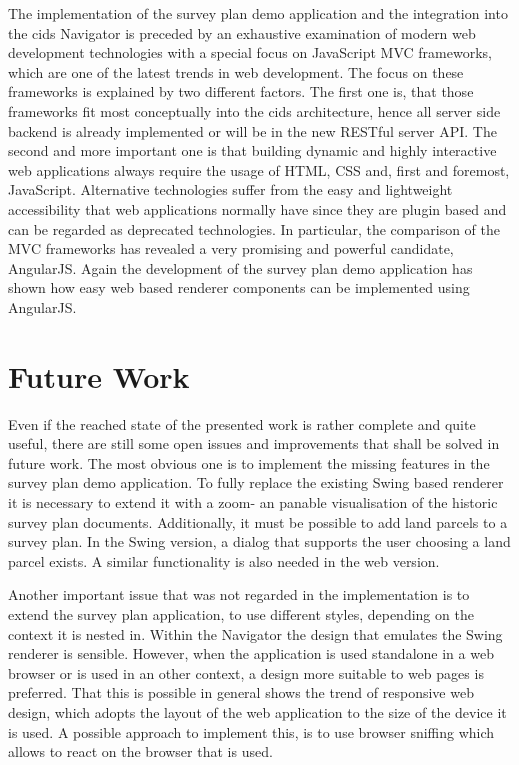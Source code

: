 The implementation of the survey plan demo application and the integration into the cids Navigator is preceded by an exhaustive examination of modern web development technologies with a special focus on JavaScript MVC frameworks, which are one of the latest trends in web development. 
The focus on these frameworks is explained by two different factors. 
The first one is, that those frameworks fit most conceptually into the cids architecture, hence all server side backend is already implemented or will be in the new RESTful server API. 
The second and more important one is that building dynamic and highly interactive web applications always require the usage of HTML, CSS and, first and foremost, JavaScript. 
Alternative technologies suffer from the easy and lightweight accessibility that web applications normally have since they are plugin based and can be regarded as deprecated technologies. 
In particular, the comparison of the MVC frameworks has revealed a very promising and powerful candidate, AngularJS. 
Again the development of the survey plan demo application has shown how easy web based renderer components can be implemented using AngularJS.  

\newpage

\section{Future Work}

Even if the reached state of the presented work is rather complete and quite useful, there are still some open issues and improvements that shall be solved in future work. 
The most obvious one is to implement the missing features in the survey plan demo application. 
To fully replace the existing Swing based renderer it is necessary to extend it with a zoom- an panable visualisation of the historic survey plan documents. 
Additionally, it must be possible to add land parcels to a survey plan. 
In the Swing version, a dialog that supports the user choosing a land parcel exists. 
A similar functionality is also needed in the web version.

Another important issue that was not regarded in the implementation is to extend the survey plan application, to use different styles, depending on the context it is nested in.
Within the Navigator the design that emulates the Swing renderer is sensible. 
However, when the application is used standalone in a web browser or is used in an other context, a design more suitable to web pages is preferred. 
That this is possible in general shows the trend of responsive web design, which adopts the layout of the web application to the size of the device it is used. 
A possible approach to implement this, is to use browser sniffing which allows to react on the browser that is used.

